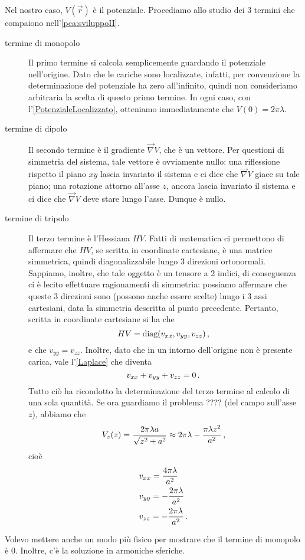 \documentclass[../main.tex]{subfiles}
\begin{document}
Nel nostro caso, $V(\vec{r})$ è il potenziale. Procediamo allo studio dei 3 termini che compaiono nell'\cref{pca:sviluppoII}.
\begin{description}
	\item [termine di monopolo] Il primo termine si calcola semplicemente guardando il potenziale nell'origine. Dato che le cariche sono localizzate, infatti, per convenzione la determinazione del potenziale ha zero all'infinito, quindi non consideriamo arbitraria la scelta di questo primo termine. In ogni caso, con l'\cref{PotenzialeLocalizzato}, otteniamo immediatamente che $V(0)=2\pi\lambda$.
	\item [termine di dipolo] Il secondo termine è il gradiente $\vec{\nabla}V$, che è un vettore. Per questioni di simmetria del sistema, tale vettore è ovviamente nullo: una riflessione rispetto il piano $xy$ lascia invariato il sistema e ci dice che $\vec{\nabla}V$ giace su tale piano; una rotazione attorno all'asse $z$, ancora lascia invariato il sistema e ci dice che $\vec{\nabla}V$ deve stare lungo l'asse. Dunque è nullo.
	\item [termine di tripolo] Il terzo termine è l'Hessiana $H V$. Fatti di matematica ci permettono di affermare che $H V$, se scritta in coordinate cartesiane, è una matrice simmetrica, quindi diagonalizzabile lungo 3 direzioni ortonormali. Sappiamo, inoltre, che tale oggetto è un tensore a 2 indici, di conseguenza ci è lecito effettuare ragionamenti di simmetria: possiamo affermare che queste 3 direzioni sono (possono anche essere scelte) lungo i 3 assi cartesiani, data la simmetria descritta al punto precedente. Pertanto, scritta in coordinate cartesiane si ha che
	\[
		H V = \text{diag}(v_{xx},v_{yy},v_{zz})\, \text{, }
	\]
	e che $v_{yy}=v_{zz}$. Inoltre, dato che in un intorno dell'origine non è presente carica, vale l'\cref{Laplace} che diventa
	\[
		v_{xx}+v_{yy}+v_{zz}=0\, \text{. }
	\]
	Tutto ciò ha ricondotto la determinazione del terzo termine al calcolo di una sola quantità. Se ora guardiamo il problema ???? (del campo sull'asse $z$), abbiamo che
	\[
		V_z(z)=\frac{2\pi\lambda a}{\sqrt{z^2+a^2}} \approx 2 \pi \lambda - \frac{\pi \lambda z^2}{a^2}\, \text{, }
	\]
	cioè
	\begin{align*}
		&v_{xx}= \frac{4\pi\lambda}{a^2}\\
		&v_{yy}= -\frac{2\pi\lambda}{a^2}\\
		&v_{zz}= -\frac{2\pi\lambda}{a^2}\, \text{. }
	\end{align*}
\end{description}

\begin{remark}
	Volevo mettere anche un modo più fisico per mostrare che il termine di monopolo è 0. Inoltre, c'è la soluzione in armoniche sferiche.
\end{remark}
\end{document}
